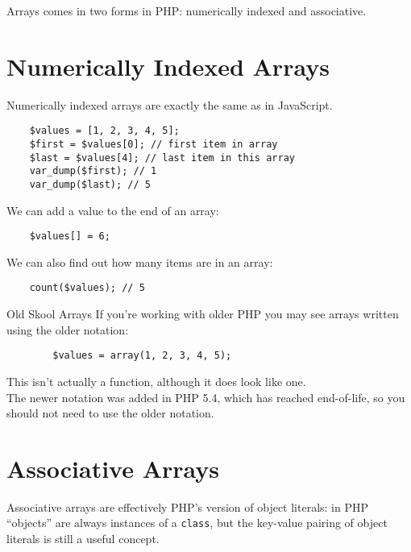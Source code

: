 Arrays comes in two forms in PHP: numerically indexed and associative.
\\


\section{Numerically Indexed Arrays}

Numerically indexed arrays are exactly the same as in JavaScript.

\begin{verbatim}
    $values = [1, 2, 3, 4, 5];
    $first = $values[0]; // first item in array
    $last = $values[4]; // last item in this array
    var_dump($first); // 1
    var_dump($last); // 5
\end{verbatim}

We can add a value to the end of an array:

\begin{verbatim}
    $values[] = 6;
\end{verbatim}

We can also find out how many items are in an array:

\begin{verbatim}
    count($values); // 5
\end{verbatim}

\begin{infobox}{Old Skool Arrays}
    If you're working with older PHP you may see arrays written using the older notation:

    \begin{verbatim}
        $values = array(1, 2, 3, 4, 5);
    \end{verbatim}

    This isn't actually a function, although it does look like one.
    \\

    The newer notation was added in PHP 5.4, which has reached end-of-life, so you should not need to use the older notation.
\end{infobox}

\section{Associative Arrays}

Associative arrays are effectively PHP's version of object literals: in PHP ``objects'' are always instances of a \texttt{class}, but the key-value pairing of object literals is still a useful concept.

